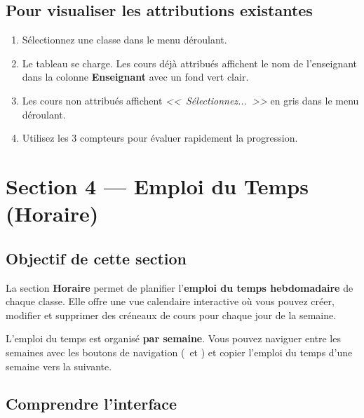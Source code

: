 \documentclass[12pt,a4paper]{report}
\begin{document}
\section{Pour visualiser les attributions existantes}

\begin{etape}[title=Proc\'edure : V\'erifier les attributions]
\begin{enumerate}[leftmargin=1.5cm,label=\textbf{\arabic*.},itemsep=8pt]
  \item S\'electionnez une classe dans le menu d\'eroulant.
  \item Le tableau se charge. Les cours d\'ej\`a attribu\'es affichent le nom de l'enseignant dans la colonne \textbf{Enseignant} avec un fond vert clair.
  \item Les cours non attribu\'es affichent \textit{<<~S\'electionnez...~>>} en gris dans le menu d\'eroulant.
  \item Utilisez les 3 compteurs pour \'evaluer rapidement la progression.
\end{enumerate}
\end{etape}

\newpage
\chapter{Section 4 --- Emploi du Temps (Horaire)}

\section{Objectif de cette section}

La section \textbf{Horaire} permet de planifier l'\textbf{emploi du temps hebdomadaire} de chaque classe. Elle offre une vue calendaire interactive o\`u vous pouvez cr\'eer, modifier et supprimer des cr\'eneaux de cours pour chaque jour de la semaine.

\begin{info}
L'emploi du temps est organis\'e \textbf{par semaine}. Vous pouvez naviguer entre les semaines avec les boutons de navigation (\faChevronLeft\ et \faChevronRight) et copier l'emploi du temps d'une semaine vers la suivante.
\end{info}

\section{Comprendre l'interface}
\end{document}
